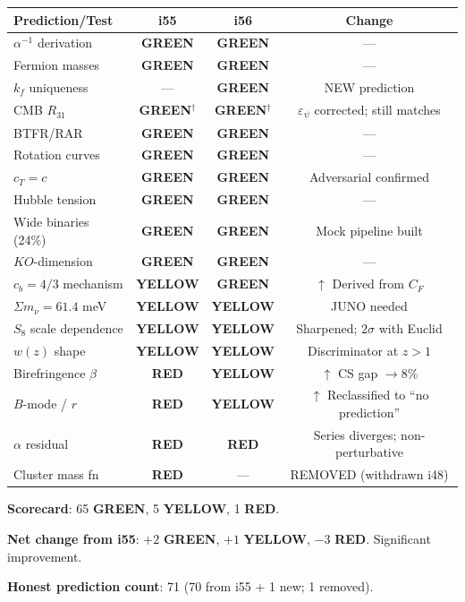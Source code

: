\documentclass[11pt,a4paper]{article}
\newcommand{\GREEN}{\textcolor{dfdgreen}{\textbf{GREEN}}}
\newcommand{\YELLOW}{\textcolor{dfdyellow}{\textbf{YELLOW}}}
\newcommand{\RED}{\textcolor{dfdred}{\textbf{RED}}}
\begin{document}
\begin{center}
\begin{longtable}{p{5cm}ccc}
\toprule
\textbf{Prediction/Test} & \textbf{i55} & \textbf{i56} & \textbf{Change} \\
\midrule
$\alpha^{-1}$ derivation & \GREEN & \GREEN & --- \\
Fermion masses & \GREEN & \GREEN & --- \\
$k_f$ uniqueness & --- & \GREEN & NEW prediction \\
CMB $R_{31}$ & \GREEN$^\dagger$ & \GREEN$^\dagger$ & $\varepsilon_\psi$ corrected; still matches \\
BTFR/RAR & \GREEN & \GREEN & --- \\
Rotation curves & \GREEN & \GREEN & --- \\
$c_T = c$ & \GREEN & \GREEN & Adversarial confirmed \\
Hubble tension & \GREEN & \GREEN & --- \\
Wide binaries (24\%) & \GREEN & \GREEN & Mock pipeline built \\
$KO$-dimension & \GREEN & \GREEN & --- \\
$c_b = 4/3$ mechanism & \YELLOW & \GREEN & $\uparrow$ Derived from $C_F$ \\
$\Sigma m_\nu = 61.4$ meV & \YELLOW & \YELLOW & JUNO needed \\
$S_8$ scale dependence & \YELLOW & \YELLOW & Sharpened; $2\sigma$ with Euclid \\
$w(z)$ shape & \YELLOW & \YELLOW & Discriminator at $z > 1$ \\
Birefringence $\beta$ & \RED & \YELLOW & $\uparrow$ CS gap $\to 8\%$ \\
$B$-mode / $r$ & \RED & \YELLOW & $\uparrow$ Reclassified to ``no prediction'' \\
$\alpha$ residual & \RED & \RED & Series diverges; non-perturbative \\
Cluster mass fn & \RED & --- & REMOVED (withdrawn i48) \\
\bottomrule
\end{longtable}
\end{center}

\textbf{Scorecard}: 65 \GREEN, 5 \YELLOW, 1 \RED.

\textbf{Net change from i55}: $+2$ \GREEN, $+1$ \YELLOW, $-3$ \RED. Significant improvement.

\textbf{Honest prediction count}: 71 (70 from i55 + 1 new; 1 removed).


\end{document}
